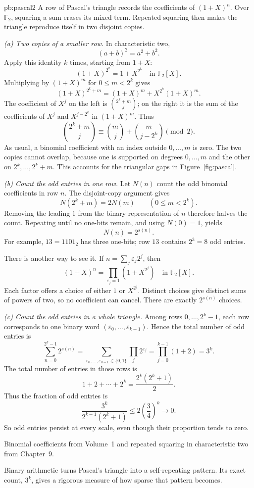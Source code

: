 \begin{solution}{pb:pascal2}
\idea A row of Pascal's triangle records the coefficients of $(1+X)^n$. Over $\mathbb F_2$, squaring a sum erases its mixed term. Repeated squaring then makes the triangle reproduce itself in two disjoint copies.

\writeup \emph{(a) Two copies of a smaller row.} In characteristic two,
\[
(a+b)^2=a^2+b^2.
\]
Apply this identity $k$ times, starting from $1+X$:
\[
(1+X)^{2^k}=1+X^{2^k}\quad\text{in }\mathbb F_2[X].
\]
Multiplying by $(1+X)^m$ for $0\le m<2^k$ gives
\[
(1+X)^{2^k+m}
=(1+X)^m+X^{2^k}(1+X)^m.
\]
The coefficient of $X^j$ on the left is $\binom{2^k+m}{j}$; on the right it is the sum of the coefficients of $X^j$ and $X^{j-2^k}$ in $(1+X)^m$. Thus
\[
\boxed{\binom{2^k+m}j\equiv
\binom mj+\binom m{j-2^k}\pmod2.}
\]
As usual, a binomial coefficient with an index outside $0,\ldots,m$ is zero. The two copies cannot overlap, because one is supported on degrees $0,\ldots,m$ and the other on $2^k,\ldots,2^k+m$. This accounts for the triangular gaps in Figure~\ref{fig:pascal}.

\emph{(b) Count the odd entries in one row.}
Let $N(n)$ count the odd binomial coefficients in row $n$. The disjoint-copy argument gives
\[
N(2^k+m)=2N(m)\qquad(0\le m<2^k).
\]
Removing the leading $1$ from the binary representation of $n$ therefore halves the count. Repeating until no one-bits remain, and using $N(0)=1$, yields
\[
\boxed{N(n)=2^{s(n)}}.
\]
For example, $13=1101_2$ has three one-bits; row $13$ contains $2^3=8$ odd entries.

There is another way to see it. If $n=\sum_j\varepsilon_j2^j$, then
\[
(1+X)^n=\prod_{\varepsilon_j=1}(1+X^{2^j})
\quad\text{in }\mathbb F_2[X].
\]
Each factor offers a choice of either $1$ or $X^{2^j}$. Distinct choices give distinct sums of powers of two, so no coefficient can cancel. There are exactly $2^{s(n)}$ choices.

\emph{(c) Count the odd entries in a whole triangle.}
Among rows $0,\ldots,2^k-1$, each row corresponds to one binary word $(\varepsilon_0,\ldots,\varepsilon_{k-1})$. Hence the total number of odd entries is
\[
\sum_{n=0}^{2^k-1}2^{s(n)}
=\sum_{\varepsilon_0,\ldots,\varepsilon_{k-1}\in\{0,1\}}
\prod_j2^{\varepsilon_j}
=\prod_{j=0}^{k-1}(1+2)
=\boxed{3^k}.
\]
The total number of entries in those rows is
\[
1+2+\cdots+2^k=\frac{2^k(2^k+1)}2.
\]
Thus the fraction of odd entries is
\[
\frac{3^k}{2^{k-1}(2^k+1)}
\le 2\left(\frac34\right)^k\longrightarrow0.
\]
So odd entries persist at every scale, even though their proportion tends to zero.

\tools Binomial coefficients from Volume~1 and repeated squaring in characteristic two from Chapter~9.

\leads Binary arithmetic turns Pascal's triangle into a self-repeating pattern. Its exact count, $3^k$, gives a rigorous measure of how sparse that pattern becomes.
\end{solution}

